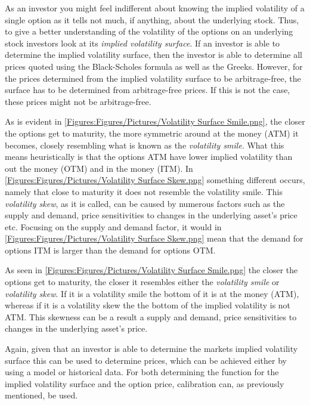 As an investor you might feel indifferent about knowing the implied volatility of a single option as it tells not much, if anything, about the underlying stock. Thus, to give a better understanding of the volatility of the options on an underlying stock investors look at its \emph{implied volatility surface}. If an investor is able to determine the implied volatility surface, then the investor is able to determine all prices quoted using the Black-Scholes formula as well as the Greeks. However, for the prices determined from the implied volatility surface to be arbitrage-free, the surface has to be determined from arbitrage-free prices. If this is not the case, these prices might not be arbitrage-free.

As is evident in \autoref{Figures:Figures/Pictures/Volatility Surface Smile.png}, the closer the options get to maturity, the more symmetric around at the money (ATM) it becomes, closely resembling what is known as the \emph{volatility smile}. What this means heuristically is that the options ATM have lower implied volatility than out the money (OTM) and in the money (ITM). In \autoref{Figures:Figures/Pictures/Volatility Surface Skew.png} something different occurs, namely that close to maturity it does not resemble the volatility smile. This \emph{volatility skew}, as it is called, can be caused by numerous factors such as the supply and demand, price sensitivities to changes in the underlying asset's price etc. Focusing on the supply and demand factor, it would in \autoref{Figures:Figures/Pictures/Volatility Surface Skew.png} mean that the demand for options ITM is larger than the demand for options OTM.

As seen in \autoref{Figures:Figures/Pictures/Volatility Surface Smile.png} the closer the options get to maturity, the closer it resembles either the \emph{volatility smile} or \emph{volatility skew}. If it is a volatility smile the bottom of it is at the money (ATM), whereas if it is a volatility skew the the bottom of the implied volatility is not ATM. This skewness can be a result a supply and demand, price sensitivities to changes in the underlying asset's price.

Again, given that an investor is able to determine the markets implied volatility surface this can be used to determine prices, which can be achieved either by using a model or historical data. For both determining the function for the implied volatility surface and the option price, calibration can, as previously mentioned, be used.


